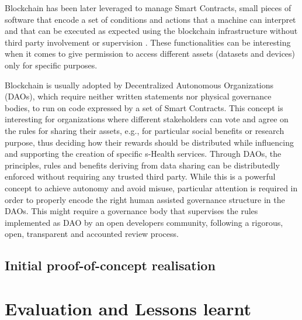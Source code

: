 \documentclass[conference]{IEEEtran}
\begin{document}
Blockchain has been later leveraged to manage Smart Contracts, small pieces of software that encode a set of conditions and actions that a machine can interpret and that can be executed as expected using the blockchain infrastructure without third party involvement or supervision \cite{Buterin2014}. These functionalities can be interesting when it comes to give permission to access different assets (datasets and devices) only for specific purposes.

Blockchain is usually adopted by Decentralized Autonomous Organizations (DAOs), which require neither written statements nor physical governance bodies, to run on code expressed by a set of Smart Contracts. This concept is interesting for organizations where different stakeholders can vote and agree on the rules for sharing their assets, e.g., for particular social benefits or research purpose, thus deciding how their rewards should be distributed while influencing and supporting the creation of specific s-Health services. Through DAOs, the principles, rules and benefits deriving from data sharing can be distributedly enforced without requiring any trusted third party. While this is a powerful concept to achieve autonomy and avoid misuse, particular attention is required in order to properly encode the right human assisted governance structure in the DAOs. This might require a governance body that supervises the rules implemented as DAO by an open developers community, following a rigorous, open, transparent and accounted review process.



\subsection{Initial proof-of-concept realisation}




\section{Evaluation and Lessons learnt}
\end{document}
